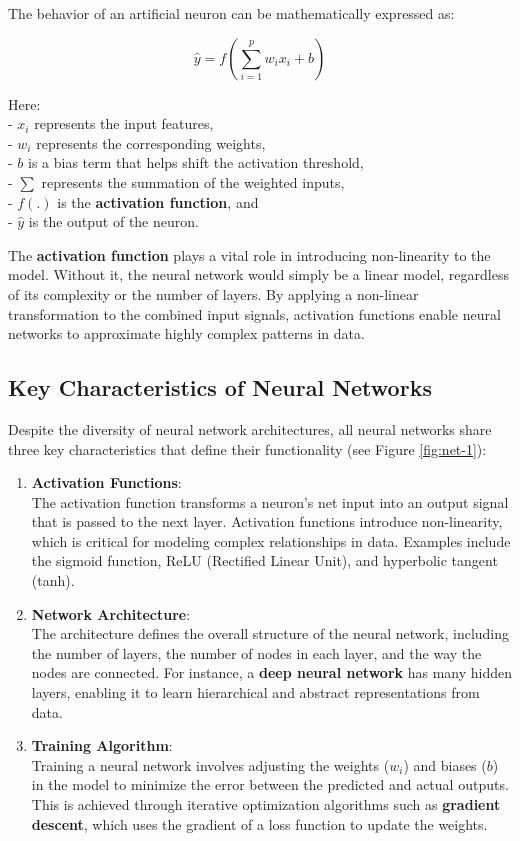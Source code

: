 \documentclass[
]{book}
\theoremstyle{definition}
\theoremstyle{definition}
\theoremstyle{definition}
\theoremstyle{definition}
\theoremstyle{remark}
\begin{document}
The behavior of an artificial neuron can be mathematically expressed as:

\[
\hat{y} = f\left( \sum_{i=1}^{p} w_i x_i + b \right)
\]

Here:\\
- \(x_i\) represents the input features,\\
- \(w_i\) represents the corresponding weights,\\
- \(b\) is a bias term that helps shift the activation threshold,\\
- \(\sum\) represents the summation of the weighted inputs,\\
- \(f(.)\) is the \textbf{activation function}, and\\
- \(\hat{y}\) is the output of the neuron.

The \textbf{activation function} plays a vital role in introducing non-linearity to the model. Without it, the neural network would simply be a linear model, regardless of its complexity or the number of layers. By applying a non-linear transformation to the combined input signals, activation functions enable neural networks to approximate highly complex patterns in data.

\subsection*{Key Characteristics of Neural Networks}\label{key-characteristics-of-neural-networks}

Despite the diversity of neural network architectures, all neural networks share three key characteristics that define their functionality (see Figure \ref{fig:net-1}):

\begin{enumerate}
\def\labelenumi{\arabic{enumi}.}
\item
  \textbf{Activation Functions}:\\
  The activation function transforms a neuron's net input into an output signal that is passed to the next layer. Activation functions introduce non-linearity, which is critical for modeling complex relationships in data. Examples include the sigmoid function, ReLU (Rectified Linear Unit), and hyperbolic tangent (tanh).
\item
  \textbf{Network Architecture}:\\
  The architecture defines the overall structure of the neural network, including the number of layers, the number of nodes in each layer, and the way the nodes are connected. For instance, a \textbf{deep neural network} has many hidden layers, enabling it to learn hierarchical and abstract representations from data.
\item
  \textbf{Training Algorithm}:\\
  Training a neural network involves adjusting the weights (\(w_i\)) and biases (\(b\)) in the model to minimize the error between the predicted and actual outputs. This is achieved through iterative optimization algorithms such as \textbf{gradient descent}, which uses the gradient of a loss function to update the weights.
\end{enumerate}
\end{document}
